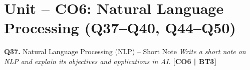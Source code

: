 \documentclass[12pt,a4paper]{article}
\newcommand{\Qno}[1]{\textbf{\color{darkred}Q#1.}}
\begin{document}
\newpage

\section{Unit -- CO6: Natural Language Processing (Q37--Q40, Q44--Q50)}

\begin{questionbox}{\Qno{37} Natural Language Processing (NLP) -- Short Note}
\textit{Write a short note on NLP and explain its objectives and applications in AI.} \hfill \textbf{[CO6 | BT3]}
\end{questionbox}
\end{document}
